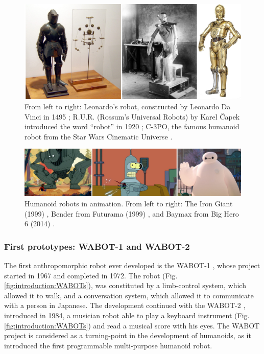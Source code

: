 \begin{figure}
    \centering
    \includegraphics[width=\textwidth]{figures/01-introduction/robot-history.jpg}
    \caption{From left to right: Leonardo's robot, constructed by Leonardo Da
        Vinci in 1495 \cite{Moran2006TheDaVinciRobot};
        R.U.R. (Rossum's Universal Robots) by Karel {\v C}apek introduced 
        the word ``robot'' in 1920 \cite{Capek1920RUR};
        C-3PO, the famous humanoid robot from the Star Wars Cinematic Universe
        \cite{StarWars1977}.
    }
    \label{fig:introduction:robots-in-history}
\end{figure}

\begin{figure}
    \centering
    \includegraphics[width=\textwidth]{figures/01-introduction/robots-in-animation.jpg}
    \caption{Humanoid robots in animation. From left to right:
        The Iron Giant (1999) \cite{TheIronGiant1999},
        Bender from Futurama (1999) \cite{Futurama1999}, and
        Baymax from Big Hero 6 (2014) \cite{BigHero62014}.
    }
    \label{fig:introduction:robots-in-animation}
\end{figure}

\subsubsection{First prototypes: WABOT-1 and WABOT-2}
The first anthropomorphic robot ever developed is the WABOT-1
\cite{Kato1973TheWABOT1}, whose project started in 1967 and completed in 1972.
The robot (Fig. \ref{fig:introduction:WABOTs}), was constituted by a limb-control
system, which allowed it to walk, and a conversation system, 
which allowed it to communicate with a person in Japanese. The development 
continued with the WABOT-2 \cite{Kato1987WABOT2}, introduced in 1984,
a musician robot able to play a keyboard instrument (Fig.
\ref{fig:introduction:WABOTs}) and read a musical score with his eyes. The WABOT
project is considered as a turning-point in the development of humanoids, as it 
introduced the first programmable multi-purpose humanoid robot.

